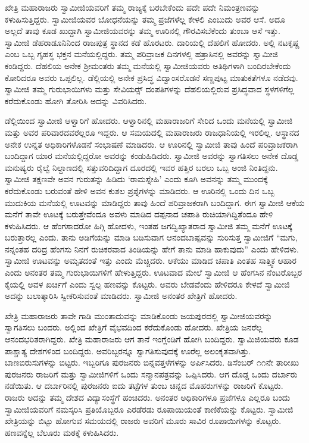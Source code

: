  ಖೇತ್ರಿ ಮಹಾರಾಜರು ಸ್ವಾಮೀಜಿಯವರಿಗೆ ತಮ್ಮ ರಾಜ್ಯಕ್ಕೆ ಬರಬೇಕೆಂದು ಪದೇ ಪದೇ ನಿಮಂತ್ರಣವನ್ನು ಕಳುಹಿಸುತ್ತಿದ್ದರು. ಸ್ವಾಮೀಜಿಯವರ ಬೋಧನೆಯನ್ನು ತಮ್ಮ ಪ್ರಜೆಗಳೆಲ್ಲ ಕೇಳಲಿ ಎಂಬುದು ಅವರ ಆಸೆ. ಅದೂ ಅಲ್ಲದೆ ತಾವು ಕೂಡ ಖುದ್ದಾಗಿ ಸ್ವಾಮೀಜಿಯವರನ್ನು ತಮ್ಮ ಊರಿನಲ್ಲಿ ಗೌರವಿಸಬೆಕೆಂದು ತುಂಬಾ ಆಸೆ ಇತ್ತು. ಸ್ವಾಮೀಜಿ ಡೆಹರಾಡೂನಿನಿಂದ ರಾಜಪುತ್ರ ಸ್ಥಾನದ ಕಡೆ ಹೊರಟರು. ದಾರಿಯಲ್ಲಿ ದೆಹಲಿಗೆ ಹೋದರು. ಅಲ್ಲಿ ನಟಕೃಷ್ಣ ಎಂಬ ಒಬ್ಬ ಗೃಹಸ್ಥ ಭಕ್ತನ ಮನೆಯಲ್ಲಿದ್ದರು. ತಮ್ಮ ಪರಿವ್ರಾಜಕ ದಿನಗಳಲ್ಲಿ ಹತ್ರಾಸಿನಲ್ಲಿ ಅವರನ್ನು ಸ್ವಾಮೀಜಿ ಕಂಡಿದ್ದರು. ದೆಹಲಿಯ ಅನೇಕ ಶ‍್ರೀಮಂತರು ತಮ್ಮ ಮನೆಯಲ್ಲಿ ಸ್ವಾಮೀಜಿಯವರು ಅತಿಥಿಗಳಾಗಿ ಬಂದಿರಬೇಕೆಂದು ಕೋರಿದರೂ ಅವರು ಒಪ್ಪಲಿಲ್ಲ. ಡೆಲ್ಲಿಯಲ್ಲಿ ಅನೇಕ ಪ್ರಸಿದ್ಧ ವಿದ್ವಾಂಸರೊಡನೆ ಸಣ್ಣಪುಟ್ಟ ಮಾತುಕತೆಗಳೂ ನಡೆದವು. ಸ್ವಾಮೀಜಿ ತಮ್ಮ ಗುರುಭಾಯಿಗಳು ಮತ್ತು ಸೇವಿಯರ್ಸ್‍‍ ದಂಪತಿಗಳನ್ನು ದೆಹಲಿಯಲ್ಲಿರುವ ಪ್ರಸಿದ್ಧವಾದ ಸ್ಥಳಗಳಿಗೆಲ್ಲ ಕರೆದುಕೊಂಡು ಹೋಗಿ ತೋರಿಸಿ ಅದನ್ನು ವಿವರಿಸಿದರು. 

 ಡೆಲ್ಲಿಯಿಂದ ಸ್ವಾಮೀಜಿ ಆಳ್ವಾರಿಗೆ ಹೋದರು. ಆಳ್ವಾರಿನಲ್ಲಿ ಮಹಾರಾಜರಿಗೆ ಸೇರಿದ ಒಂದು ಮನೆಯಲ್ಲಿ ಸ್ವಾಮೀಜಿ ಮತ್ತು ಅವರ ಪರಿವಾರದವರೆಲ್ಲರೂ ಇದ್ದರು. ಆ ಸಮಯದಲ್ಲಿ ಮಹಾರಾಜರು ರಾಜಧಾನಿಯಲ್ಲಿ ಇರಲಿಲ್ಲ. ಆಸ್ಥಾನದ ಅನೇಕ ಉನ್ನತ ಅಧಿಕಾರಿಗಳೊಡನೆ ಸಂಭಾಷಣೆ ಮಾಡಿದರು. ಆ ಊರಿನಲ್ಲಿ ಸ್ವಾಮೀಜಿ ತಾವು ಹಿಂದೆ ಪರಿವ್ರಾಜಕರಾಗಿ ಬಂದಿದ್ದಾಗ ಯಾರ ಮನೆಯಲ್ಲಿದ್ದರೋ ಅವರನ್ನು ಕಂಡುಹಿಡಿದರು. ಸ್ವಾಮೀಜಿ ಅವರನ್ನು ಸ್ವಾಗತಿಸಲು ಅನೇಕ ದೊಡ್ಡ ಮನುಷ್ಯರು ರೈಲ್ವೆ ನಿಲ್ದಾಣದಲ್ಲಿ ಸತ್ತುವರಿದಿದ್ದಾಗ ದೂರದಲ್ಲಿ ಇವರ ಹತ್ತಿರ ಬರಲು ಒಬ್ಬ ಅಂಜಿ ನಿಂತಿದ್ದನು. ಸ್ವಾಮೀಜಿ ತಕ್ಷಣವೇ ಅವನ ಗುರುತನ್ನು ಹಿಡಿದು ‘ರಾಮಸ್ನೇಹಿ’ ಎಂದು ಕೂಗಿ ಅವನನ್ನು ತಮ್ಮ ಮುಂದಕ್ಕೆ ಕರೆದುಕೊಂಡು ಬರುವಂತೆ ಹೇಳಿ ಅವನ ಕುಶಲ ಪ್ರಶ್ನೆಗಳನ್ನು ಮಾಡಿದರು. ಆ ಊರಿನಲ್ಲಿ ಒಂದು ದಿನ ಒಬ್ಬ ಮುದುಕಿಯ ಮನೆಯಲ್ಲಿ ಊಟವನ್ನು ಮಾಡಿದ್ದರು ತಾವು ಹಿಂದೆ ಪರಿವ್ರಾಜಕರಾಗಿ ಬಂದಿದ್ದಾಗ. ಈಗ ಸ್ವಾಮೀಜಿ ಆಕೆಯ ಮನೆಗೆ ತಾವೇ ಊಟಕ್ಕೆ ಬರುತ್ತೇವೆಂದೂ ಅವಳು ಮಾಡಿದ ದಪ್ಪನಾದ ಚಪಾತಿ ರುಚಿಯಾಗಿದ್ದಿತೆಂದೂ ಹೇಳಿ ಕಳುಹಿಸಿದರು. ಆ ಹೆಂಗಸಾದರೋ ಹಿಗ್ಗಿ ಹೋದಳು, ಇಂತಹ ಜಗದ್ವಿಖ್ಯಾತರಾದ ಸ್ವಾಮೀಜಿ ತಮ್ಮ ಮನೆಗೆ ಊಟಕ್ಕೆ ಬರುತ್ತಾರಲ್ಲ ಎಂದು. ತಾನು ಅಡಿಗೆಯನ್ನು ಮಾಡಿ ಬಡಿಸುವಾಗ ಆನಂದಬಾಷ್ಪವನ್ನು ಸುರಿಸುತ್ತ ಸ್ವಾಮೀಜಿಗೆ “ಮಗು, ನನ್ನಂತಹ ದರಿದ್ರ ಹೆಂಗಸು ನಿನಗೆ ರುಚಿಕರವಾದ ತಿಂಡಿಯನ್ನು ಹೇಗೆ ತಾನು ಮಾಡಿ ಹಾಕುವುದು” ಎಂದು ಹೇಳಿದಳು. ಸ್ವಾಮೀಜಿ ಊಟವನ್ನು ಅಮೃತದಂತೆ ಇತ್ತು ಎಂದು ಮೆಚ್ಚಿದರು. ಆಕೆಯು ಮಾಡಿದ ಚಪಾತಿ ಎಂತಹ ಸಾತ್ತ್ವಿಕ ಆಹಾರ ಎಂದು ಅನಂತರ ತಮ್ಮ ಗುರುಭಾಯಿಗಳಿಗೆ ಹೇಳುತ್ತಿದ್ದರು. ಊಟವಾದ ಮೇಲೆ ಸ್ವಾಮೀಜಿ ಆ ಹೆಂಗಸಿನ ನೆಂಟರೊಬ್ಬರ ಕೈಯಲ್ಲಿ ಅವಳ ಖರ್ಚಿಗೆ ಎಂದು ಸ್ವಲ್ಪ ಹಣವನ್ನು ಕೊಟ್ಟರು. ಅವರು ಬೇಡವೆಂದು ಹೇಳಿದರೂ ಕೇಳದೆ ಸ್ವಾಮೀಜಿ ಅದನ್ನು ಬಲಾತ್ಕಾರಿಸಿ ಸ್ವೀಕರಿಸುವಂತೆ ಮಾಡಿದರು. ಸ್ವಾಮೀಜಿ ಅನಂತರ ಖೇತ್ರಿಗೆ ಹೋದರು. 

 ಖೇತ್ರಿ ಮಹಾರಾಜರು ತಾವೇ ಗಾಡಿ ಮುಂತಾದುವನ್ನು ಮಾಡಿಕೊಂಡು ಜಯಪುರದಲ್ಲಿ ಸ್ವಾಮೀಜಿಯವರನ್ನು ಸ್ವಾಗತಿಸಲು ಬಂದರು. ಅಲ್ಲಿಂದ ಖೇತ್ರಿಗೆ ವೈಭವದಿಂದ ಕರೆದುಕೊಂಡು ಹೋದರು. ಖೇತ್ರಿಯ ಜನರೆಲ್ಲ ಆನಂದಭರಿತರಾಗಿದ್ದರು. ಖೇತ್ರಿ ಮಹಾರಾಜರು ಆಗ ತಾನೆ ಇಂಗ್ಲೆಂಡಿಗೆ ಹೋಗಿ ಬಂದಿದ್ದರು. ಸ್ವಾಮಿಜಿಯವರು ಕೂಡ ಪಾಶ್ಚಾತ್ಯ ದೇಶಗಳಿಂದ ಬಂದಿದ್ದರು. ಅವರಿಬ್ಬರನ್ನೂ ಸ್ವಾಗತಿಸುವುದಕ್ಕೆ ಊರೆಲ್ಲ ಅಲಂಕೃತವಾಗಿತ್ತು. ಬಾಣಬಿರುಸುಗಳನ್ನು ಬಿಟ್ಟರು. ಇಬ್ಬರಿಗೂ ಪುರಜನರು ಬಿನ್ನವತ್ತಳೆಗಳನ್ನು ಅರ್ಪಿಸಿದರು. ಡಿಸೆಂಬರ್ ೧೧ನೇ ತಾರೀಖು ಪುರಜನರು ರಾಜರಿಗೆ ಮತ್ತು ಸ್ವಾಮೀಜಿಗಳಿಗೆ ಒಂದು ಸನ್ಮಾನಪತ್ರವನ್ನು ಒಪ್ಪಿಸಿದರು. ಆಗ ದೊಡ್ಡ ಒಂದು ದರ್ಬಾರು ನಡೆಯಿತು. ಆ ದರ್ಬಾರಿನಲ್ಲಿ ಪುರಜನರು ಐದು ತಟ್ಟೆಗಳ ತುಂಬ ಚಿನ್ನದ ಮೊಹರುಗಳನ್ನು ರಾಜರಿಗೆ ಕೊಟ್ಟರು. ರಾಜರು ಅದನ್ನು ತಮ್ಮ ದೇಶದ ವಿದ್ಯಾಸಂಸ್ಥೆಗೆ ಹಂಚಿದರು. ಅನಂತರ ಅಧಿಕಾರಿಗಳೂ ಪ್ರಜೆಗಳೂ ಎಲ್ಲರೂ ಬಂದು ಸ್ವಾಮೀಜಿಯವರಿಗೆ ನಮಸ್ಕರಿಸಿ ಪ್ರತಿಯೊಬ್ಬರೂ ಎರಡೆರಡು ರೂಪಾಯಿಯಂತೆ ಕಾಣಿಕೆಯನ್ನು ಕೊಟ್ಟರು. ಸ್ವಾಮೀಜಿ ಖೇತ್ರಿಯನ್ನು ಬಿಟ್ಟು ಹೋಗುವ ಸಮಯದಲ್ಲಿ ರಾಜರು ಅವರಿಗೆ ಮೂರು ಸಾವಿರ ರೂಪಾಯಿಗಳನ್ನು ಕೊಟ್ಟರು. ಹಣವನ್ನೆಲ್ಲ ಬೆಲೂರು ಮಠಕ್ಕೆ ಕಳುಹಿಸಿದರು. 

